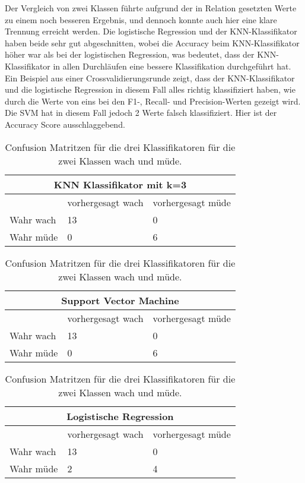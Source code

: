 Der Vergleich von zwei Klassen führte aufgrund der in Relation gesetzten Werte zu einem noch besseren Ergebnis, und dennoch konnte auch hier eine klare Trennung erreicht werden. Die logistische Regression und der KNN-Klassifikator haben beide sehr gut abgeschnitten, wobei die Accuracy beim KNN-Klassifikator höher war als bei der logistischen Regression, was bedeutet, dass der KNN-Klassifikator in allen Durchläufen eine bessere Klassifikation durchgeführt hat. Ein Beispiel aus einer Crossvalidierungsrunde zeigt, dass der KNN-Klassifikator und die logistische Regression in diesem Fall alles richtig klassifiziert haben, wie durch die Werte von eins bei den F1-, Recall- und Precision-Werten gezeigt wird. Die SVM hat in diesem Fall jedoch 2 Werte falsch klassifiziert. Hier ist der Accuracy Score ausschlaggebend.


\begin{table}
    \centering
    \begin{tabular}{|l|l|l|}
    \hline
    \multicolumn{3}{|c|}{KNN Klassifikator mit k=3} \\ \hline
    & vorhergesagt wach & vorhergesagt müde \\ \hline
    Wahr wach & 13 & 0 \\ \hline
    Wahr müde & 0 & 6 \\ \hline
    \end{tabular}
    
    \vspace{0.5cm} %
    
    \begin{tabular}{|l|l|l|}
    \hline
    \multicolumn{3}{|c|}{Support Vector Machine} \\ \hline
    & vorhergesagt wach & vorhergesagt müde \\ \hline
    Wahr wach & 13 & 0 \\ \hline
    Wahr müde & 0 & 6 \\ \hline
    \end{tabular}
    
    \vspace{0.5cm} %
    
    \begin{tabular}{|l|l|l|}
    \hline
    \multicolumn{3}{|c|}{Logistische Regression} \\ \hline
    & vorhergesagt wach & vorhergesagt müde \\ \hline
    Wahr wach & 13 & 0 \\ \hline
    Wahr müde & 2 & 4 \\ \hline
    \end{tabular}
\caption{Confusion Matritzen für die drei Klassifikatoren für die zwei Klassen wach und müde.}
\label{table:confusionmatrixtwoclasses}
\end{table}

